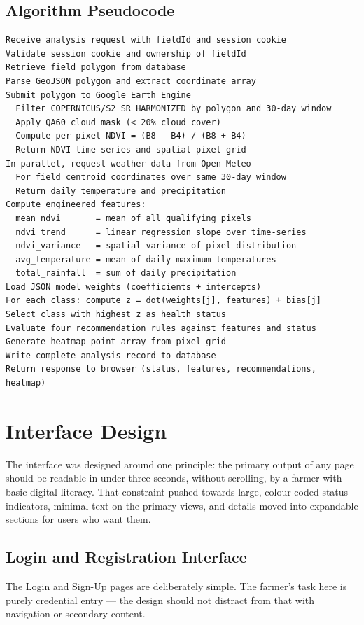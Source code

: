 \subsection{Algorithm Pseudocode}

\begin{verbatim}
Receive analysis request with fieldId and session cookie
Validate session cookie and ownership of fieldId
Retrieve field polygon from database
Parse GeoJSON polygon and extract coordinate array
Submit polygon to Google Earth Engine
  Filter COPERNICUS/S2_SR_HARMONIZED by polygon and 30-day window
  Apply QA60 cloud mask (< 20% cloud cover)
  Compute per-pixel NDVI = (B8 - B4) / (B8 + B4)
  Return NDVI time-series and spatial pixel grid
In parallel, request weather data from Open-Meteo
  For field centroid coordinates over same 30-day window
  Return daily temperature and precipitation
Compute engineered features:
  mean_ndvi       = mean of all qualifying pixels
  ndvi_trend      = linear regression slope over time-series
  ndvi_variance   = spatial variance of pixel distribution
  avg_temperature = mean of daily maximum temperatures
  total_rainfall  = sum of daily precipitation
Load JSON model weights (coefficients + intercepts)
For each class: compute z = dot(weights[j], features) + bias[j]
Select class with highest z as health status
Evaluate four recommendation rules against features and status
Generate heatmap point array from pixel grid
Write complete analysis record to database
Return response to browser (status, features, recommendations, heatmap)
\end{verbatim}

\section{Interface Design}

The interface was designed around one principle: the primary output of any page should be readable in under three seconds, without scrolling, by a farmer with basic digital literacy. That constraint pushed towards large, colour-coded status indicators, minimal text on the primary views, and details moved into expandable sections for users who want them. \citet{rose2016}

\subsection{Login and Registration Interface}

The Login and Sign-Up pages are deliberately simple. The farmer's task here is purely credential entry — the design should not distract from that with navigation or secondary content.

